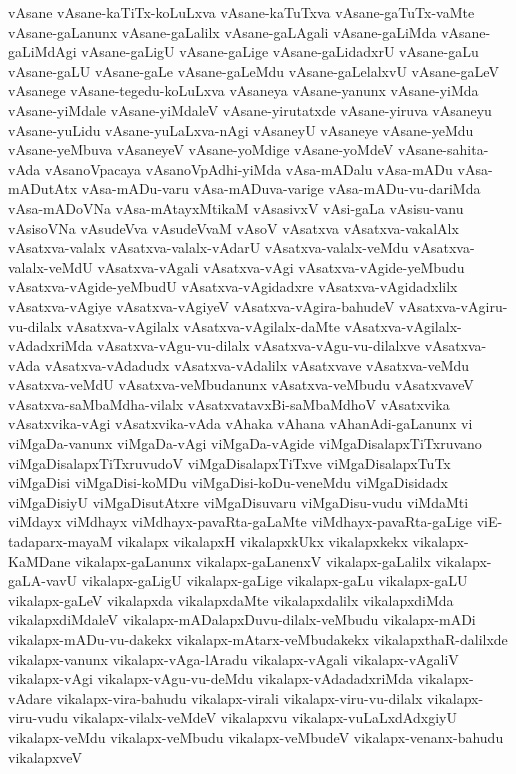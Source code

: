 {vAsane
vAsane-kaTiTx-koLuLxva
vAsane-kaTuTxva
vAsane-gaTuTx-vaMte
vAsane-gaLanunx
vAsane-gaLalilx
vAsane-gaLAgali
vAsane-gaLiMda
vAsane-gaLiMdAgi
vAsane-gaLigU
vAsane-gaLige
vAsane-gaLidadxrU
vAsane-gaLu
vAsane-gaLU
vAsane-gaLe
vAsane-gaLeMdu
vAsane-gaLelalxvU
vAsane-gaLeV
vAsanege
vAsane-tegedu-koLuLxva
vAsaneya
vAsane-yanunx
vAsane-yiMda
vAsane-yiMdale
vAsane-yiMdaleV
vAsane-yirutatxde
vAsane-yiruva
vAsaneyu
vAsane-yuLidu
vAsane-yuLaLxva-nAgi
vAsaneyU
vAsaneye
vAsane-yeMdu
vAsane-yeMbuva
vAsaneyeV
vAsane-yoMdige
vAsane-yoMdeV
vAsane-sahita-vAda
vAsanoVpacaya
vAsanoVpAdhi-yiMda
vAsa-mADalu
vAsa-mADu
vAsa-mADutAtx
vAsa-mADu-varu
vAsa-mADuva-varige
vAsa-mADu-vu-dariMda
vAsa-mADoVNa
vAsa-mAtayxMtikaM
vAsasivxV
vAsi-gaLa
vAsisu-vanu
vAsisoVNa
vAsudeVva
vAsudeVvaM
vAsoV
vAsatxva
vAsatxva-vakalAlx
vAsatxva-valalx
vAsatxva-valalx-vAdarU
vAsatxva-valalx-veMdu
vAsatxva-valalx-veMdU
vAsatxva-vAgali
vAsatxva-vAgi
vAsatxva-vAgide-yeMbudu
vAsatxva-vAgide-yeMbudU
vAsatxva-vAgidadxre
vAsatxva-vAgidadxlilx
vAsatxva-vAgiye
vAsatxva-vAgiyeV
vAsatxva-vAgira-bahudeV
vAsatxva-vAgiru-vu-dilalx
vAsatxva-vAgilalx
vAsatxva-vAgilalx-daMte
vAsatxva-vAgilalx-vAdadxriMda
vAsatxva-vAgu-vu-dilalx
vAsatxva-vAgu-vu-dilalxve
vAsatxva-vAda
vAsatxva-vAdadudx
vAsatxva-vAdalilx
vAsatxvave
vAsatxva-veMdu
vAsatxva-veMdU
vAsatxva-veMbudanunx
vAsatxva-veMbudu
vAsatxvaveV
vAsatxva-saMbaMdha-vilalx
vAsatxvatavxBi-saMbaMdhoV
vAsatxvika
vAsatxvika-vAgi
vAsatxvika-vAda
vAhaka
vAhana
vAhanAdi-gaLanunx
vi
viMgaDa-vanunx
viMgaDa-vAgi
viMgaDa-vAgide
viMgaDisalapxTiTxruvano
viMgaDisalapxTiTxruvudoV
viMgaDisalapxTiTxve
viMgaDisalapxTuTx
viMgaDisi
viMgaDisi-koMDu
viMgaDisi-koDu-veneMdu
viMgaDisidadx
viMgaDisiyU
viMgaDisutAtxre
viMgaDisuvaru
viMgaDisu-vudu
viMdaMti
viMdayx
viMdhayx
viMdhayx-pavaRta-gaLaMte
viMdhayx-pavaRta-gaLige
viE-tadaparx-mayaM
vikalapx
vikalapxH
vikalapxkUkx
vikalapxkekx
vikalapx-KaMDane
vikalapx-gaLanunx
vikalapx-gaLanenxV
vikalapx-gaLalilx
vikalapx-gaLA-vavU
vikalapx-gaLigU
vikalapx-gaLige
vikalapx-gaLu
vikalapx-gaLU
vikalapx-gaLeV
vikalapxda
vikalapxdaMte
vikalapxdalilx
vikalapxdiMda
vikalapxdiMdaleV
vikalapx-mADalapxDuvu-dilalx-veMbudu
vikalapx-mADi
vikalapx-mADu-vu-dakekx
vikalapx-mAtarx-veMbudakekx
vikalapxthaR-dalilxde
vikalapx-vanunx
vikalapx-vAga-lAradu
vikalapx-vAgali
vikalapx-vAgaliV
vikalapx-vAgi
vikalapx-vAgu-vu-deMdu
vikalapx-vAdadadxriMda
vikalapx-vAdare
vikalapx-vira-bahudu
vikalapx-virali
vikalapx-viru-vu-dilalx
vikalapx-viru-vudu
vikalapx-vilalx-veMdeV
vikalapxvu
vikalapx-vuLaLxdAdxgiyU
vikalapx-veMdu
vikalapx-veMbudu
vikalapx-veMbudeV
vikalapx-venanx-bahudu
vikalapxveV
}
